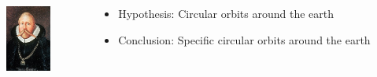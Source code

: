 \documentclass{beamer}
\newcommand{\pnote}[1] {}
\begin{document}
\begin{frame}
\begin{columns}
\begin{column}{0.5\textwidth}
{      }
    \end{column}
  \end{columns}
  \begin{columns}
    \begin{column}{0.1\textwidth}
      \includegraphics[width=4em]{figures/Tycho-Brahe.jpg}
    \end{column}
    \begin{column}{0.9\textwidth}
      \begin{itemize}
      \item<3-> Hypothesis: \alert{Circular} orbits around the \alert{earth}
      \item<4-> Conclusion: \alert{Specific} circular orbits around the earth
      \end{itemize}
    \end{column}
  \end{columns}
\end{frame}
\pnote{Let's take the example of planetary orbits. Here Tycho famously
 spent 20 years experimentally measuring the location of Mars. He
 had a hypothesis: that planetary orbits were circular, but he
 didn't know which were the right orbits. When he tried to fit his data to this hypothesis, he concluded a specific circular orbit for Mars... around Earth.}
\end{document}

